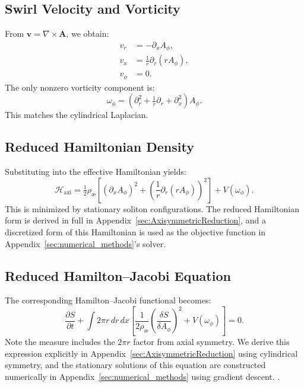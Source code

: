 \documentclass[preprint,notitlepage]{revtex4-2}
\begin{document}
    \subsection{Swirl Velocity and Vorticity}
    From $\mathbf v = \nabla \times \mathbf A$, we obtain:
    \begin{align}
      v_r &= -\partial_x A_\phi, \\
      v_x &= \frac{1}{r} \partial_r(r A_\phi), \\
      v_\phi &= 0.
    \end{align}
    The only nonzero vorticity component is:
    \begin{equation}
      \omega_\phi = (\partial_r^2 + \tfrac{1}{r} \partial_r + \partial_x^2) A_\phi.
    \end{equation}
    This matches the cylindrical Laplacian.

    \subsection{Reduced Hamiltonian Density}
    Substituting into the effective Hamiltonian yields:
    \begin{equation}
      \mathcal H_{\text{axi}} = \tfrac12 \rho_{æ} \left[ (\partial_x A_\phi)^2 + \left( \frac{1}{r} \partial_r (r A_\phi) \right)^2 \right] + V(\omega_\phi).
    \end{equation}
    This is minimized by stationary soliton configurations.
    The reduced Hamiltonian form is derived in full in Appendix~\ref{sec:AxisymmetricReduction}, and a discretized form of this Hamiltonian is used as the objective function in Appendix~\ref{sec:numerical_methods}’s solver.

    \subsection{Reduced Hamilton–Jacobi Equation}
    The corresponding Hamilton–Jacobi functional becomes:
    \begin{equation}
      \frac{\partial S}{\partial t} + \int 2\pi r \,dr\,dx \left[ \frac{1}{2 \rho_{æ}} \left( \frac{\delta S}{\delta A_\phi} \right)^2 + V(\omega_\phi) \right] = 0.
    \end{equation}
    Note the measure includes the $2\pi r$ factor from axial symmetry.
    We derive this expression explicitly in Appendix~\ref{sec:AxisymmetricReduction} using cylindrical symmetry, and the stationary solutions of this equation are constructed numerically in Appendix~\ref{sec:numerical_methods} using gradient descent.
.
\end{document}
